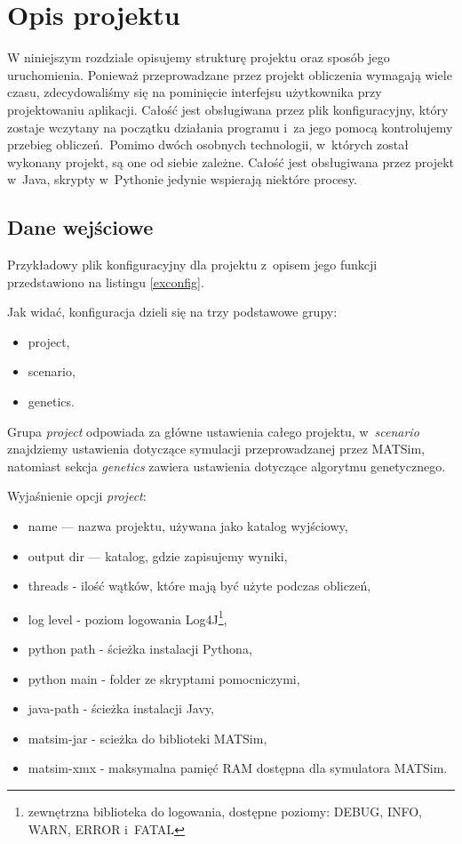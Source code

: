 \documentclass[twoside,12pt]{report}
\let\oldsection\chapter
\def\chapter{\cleardoublepage\oldsection}
\begin{document}
\chapter{Opis projektu}\label{rozdz.opis} 

W niniejszym rozdziale opisujemy strukturę projektu oraz sposób jego uruchomienia. Ponieważ przeprowadzane przez projekt obliczenia wymagają wiele czasu, zdecydowaliśmy się na pominięcie interfejsu użytkownika przy projektowaniu aplikacji. Całość jest obsługiwana przez plik konfiguracyjny, który zostaje wczytany na początku działania programu i~za jego pomocą kontrolujemy przebieg obliczeń.~Pomimo dwóch osobnych technologii, w~których został wykonany projekt, są one od siebie zależne. Całość jest obsługiwana przez projekt w~Java, skrypty w~Pythonie jedynie wspierają niektóre procesy.

\section{Dane wejściowe}

Przykładowy plik konfiguracyjny dla projektu z~opisem jego funkcji przedstawiono na listingu \ref{exconfig}.

 


Jak widać, konfiguracja dzieli się na trzy podstawowe grupy:
\begin{itemize}
\item project,
\item scenario,
\item genetics.
\end{itemize}

Grupa \textit{project} odpowiada za główne ustawienia całego projektu, w~\textit{scenario} znajdziemy ustawienia dotyczące symulacji przeprowadzanej przez MATSim, natomiast sekcja \textit{genetics} zawiera ustawienia dotyczące algorytmu genetycznego.

Wyjaśnienie opcji \textit{project}:
\begin{itemize}
\item name --- nazwa projektu, używana jako katalog wyjściowy,
\item output dir --- katalog, gdzie zapisujemy wyniki,
\item threads - ilość wątków, które mają być użyte podczas obliczeń,
\item log level - poziom logowania Log4J\footnote{zewnętrzna biblioteka do logowania, dostępne poziomy: DEBUG, INFO, WARN, ERROR i~FATAL},
\item python path - ścieżka instalacji Pythona,
\item python main - folder ze skryptami pomocniczymi,
\item java-path - ścieżka instalacji Javy,
\item matsim-jar - scieżka do biblioteki MATSim,
\item matsim-xmx - maksymalna pamięć RAM dostępna dla symulatora MATSim.
\end{itemize}
\end{document}
